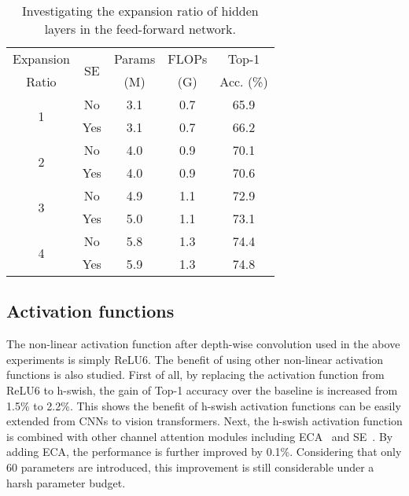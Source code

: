 \documentclass[10pt,twocolumn,letterpaper]{article}
\begin{document}
\begin{table}[!t]
    \small
    \begin{center}
        \begin{tabular}{c|c|c|c|c}
            \toprule
            \multicolumn{1}{c|}{Expansion} & \multirow{2}{*}{SE} & Params & FLOPs & \multicolumn{1}{c}{Top-1} \\ 
            \multicolumn{1}{c|}{Ratio } & & \multicolumn{1}{c|}{(M)} & \multicolumn{1}{c|}{(G)} & \multicolumn{1}{c}{Acc. (\%)} \\\midrule
            \multirow{2}{*}{1} & No & 3.1 & 0.7 & 65.9\\
            & Yes & 3.1 & 0.7 & 66.2\\ \midrule
            \multirow{2}{*}{2} & No & 4.0 & 0.9 & 70.1 \\
            & Yes & 4.0 & 0.9 & 70.6 \\ \midrule
            \multirow{2}{*}{3} & No & 4.9 & 1.1 & 72.9 \\
            & Yes & 5.0 & 1.1 & 73.1 \\ \midrule
            \multirow{2}{*}{4} & No & 5.8 & 1.3 & 74.4 \\
            & Yes & 5.9 & 1.3 & 74.8\\ \bottomrule
        \end{tabular}
    \end{center}
\caption{Investigating the expansion ratio of hidden layers in the feed-forward network.}
    \label{tbl:expansion_ratio}
\end{table}

\subsection{Activation functions}
The non-linear activation function after depth-wise convolution used in the above experiments is simply ReLU6. The benefit of using other non-linear activation functions is also studied. First of all, by replacing the activation function from ReLU6 to h-swish, the gain of Top-1 accuracy over the baseline is increased from 1.5\% to 2.2\%. This shows the benefit of h-swish activation functions can be easily extended from CNNs to vision transformers. Next, the h-swish activation function is combined with other channel attention modules including ECA~\cite{wang2020efficient} and SE~\cite{hu2018squeeze}. By adding ECA, the performance is further improved by 0.1\%. Considering that only 60 parameters are introduced, this improvement is still considerable under a harsh parameter budget. 
\end{document}
